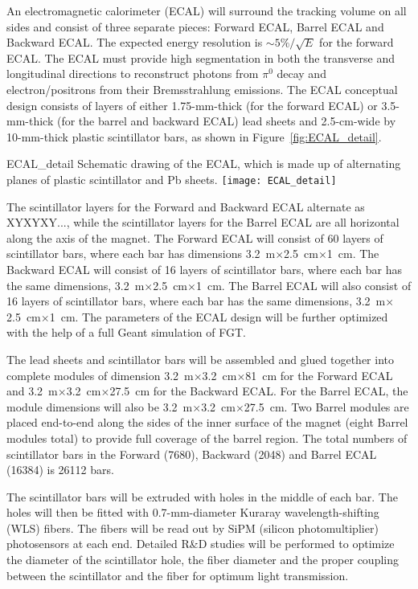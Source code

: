 An electromagnetic calorimeter (ECAL) will surround the tracking
volume on all sides and consist of three separate pieces: Forward
ECAL, Barrel ECAL and Backward ECAL.  The expected energy resolution
is $\sim 5\% / \sqrt{E}$ for the forward ECAL.  The ECAL must provide
high segmentation in both the transverse and longitudinal directions
to reconstruct photons from $\pi^0$ decay and electron/positrons from
their Bremsstrahlung emissions.  The ECAL conceptual design consists
of layers of either 1.75-mm-thick (for the forward ECAL) or
3.5-mm-thick (for the barrel and backward ECAL) lead sheets and
2.5-cm-wide by 10-mm-thick plastic scintillator bars, as shown in
Figure~\ref{fig:ECAL_detail}.
\begin{cdrfigure}{ECAL_detail}
{Schematic drawing of the ECAL, which is made up of alternating planes
of plastic scintillator and Pb sheets.}
\texttt{[image: ECAL\_detail]}
\end{cdrfigure}
The scintillator layers for the Forward and Backward ECAL alternate as
XYXYXY..., while the scintillator layers for the Barrel ECAL are all
horizontal along the axis of the magnet.  The Forward ECAL will
consist of 60 layers of scintillator bars, where each bar has
dimensions 3.2~m$\times$2.5~cm$\times$1~cm. The Backward ECAL will
consist of 16 layers of scintillator bars, where each bar has the same
dimensions, 3.2~m$\times$2.5~cm$\times$1~cm. The Barrel ECAL will also
consist of 16 layers of scintillator bars, where each bar has the same
dimensions, 3.2~m$\times$2.5~cm$\times$1~cm. The parameters of the
ECAL design will be further optimized with the help of a full Geant
simulation of FGT.

The lead sheets and scintillator bars will be assembled and glued
together into complete modules of dimension
3.2~m$\times$3.2~cm$\times$81~cm for the Forward ECAL and
3.2~m$\times$3.2~cm$\times$27.5~cm for the Backward ECAL. For the
Barrel ECAL, the module dimensions will also be
3.2~m$\times$3.2~cm$\times$27.5~cm. Two Barrel modules are placed
end-to-end along the sides of the inner surface of the magnet (eight
Barrel modules total) to provide full coverage of the barrel region.
The total numbers of scintillator bars in the Forward (7680), Backward
(2048) and Barrel ECAL (16384) is 26112 bars.

The scintillator bars will be extruded with holes in the middle of
each bar. The holes will then be fitted with 0.7-mm-diameter Kuraray
wavelength-shifting (WLS) fibers.  The fibers will be read out by SiPM
(silicon photomultiplier) photosensors at each end.  Detailed R\&D
studies will be performed to optimize the diameter of the scintillator
hole, the fiber diameter and the proper coupling between the
scintillator and the fiber for optimum light transmission.


